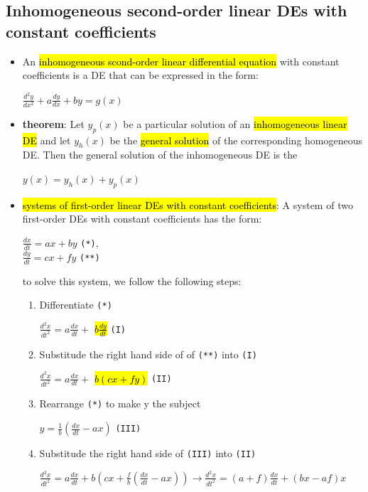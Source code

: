 \documentclass{article}
\begin{document}
    \subsection*{Inhomogeneous second-order linear DEs with constant coefficients}

    \begin{itemize}
      \item An \hl{inhomogeneous scond-order linear differential equation} with constant coefficients is a DE that can be expressed in the form:
      \begin{center}
        $\frac{d^2y}{dx^2} + a\frac{dy}{dx} + by = g(x)$
      \end{center}

      \item \textbf{theorem}: Let $y_p(x)$ be a particular solution of an \hl{inhomogeneous linear DE} and let $y_h(x)$ be the \hl{general solution} of the corresponding homogeneous DE. Then the general solution of the inhomogeneous DE is the
      \begin{center}
        $y(x) = y_h(x) + y_p(x)$
      \end{center}

      \item \hl{systems of first-order linear DEs with constant coefficients}: A system of two first-order DEs with constant coefficients has the form:

      \begin{center}
        $\frac{dx}{dt} = ax + by$ \texttt{(*)},\\
        $\frac{dy}{dt} = cx + fy$ \texttt{(**)}
      \end{center}

      to solve this system, we follow the following steps:
      \begin{enumerate}
        \item Differentiate \texttt{(*)}
          \begin{center}
            $\frac{d^2x}{dt^2} = a\frac{dx}{dt} +$ \hl{$b \frac{dy}{dt}$} \texttt{(I)}
          \end{center}

        \item Substitude the right hand side of of \texttt{(**)} into \texttt{(I)}
          \begin{center}
            $\frac{d^2x}{dt^2} = a\frac{dx}{dt} +$ \hl{$b(cx + fy)$} \texttt{(II)}
          \end{center}

        \item Rearrange \texttt{(*)} to make y the subject
          \begin{center}
            $y = \frac{1}{b} (\frac{dx}{dt} - ax)$ \texttt{(III)}
          \end{center} 
        \item Substitude the right hand side of \texttt{(III)} into \texttt{(II)} 
          \begin{center}
            $\frac{d^2x}{dt^2} = a \frac{dx}{dt} + b(cx + 
            \frac{f}{b}(\frac{dx}{dt}-ax)) \rightarrow \frac{d^2x}{dt^2} = (a+f)\frac{dx}{dt} + (bx - af)x$
          \end{center}


\end{enumerate}
\end{itemize}
\end{document}
